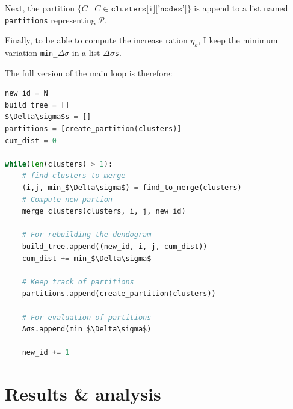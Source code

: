 \documentclass[12pt]{article}
\theoremstyle{definition}
\begin{document}
Next, the partition $\{C \mid C \in \texttt{clusters[i]['nodes']} \}$ is append to a list named \texttt{partitions} representing $\mathcal{P}$.

Finally, to be able to compute the increase ration $\eta_k$, I keep the minimum variation \texttt{min\_$\Delta\sigma$} in a list \texttt{$\Delta\sigma$s}.

The full version of the main loop is therefore:
\begin{lstlisting}[language=Python, mathescape]
new_id = N
build_tree = []
$\Delta\sigma$s = []
partitions = [create_partition(clusters)]
cum_dist = 0

while(len(clusters) > 1):    
    # find clusters to merge
    (i,j, min_$\Delta\sigma$) = find_to_merge(clusters)
    # Compute new partion
    merge_clusters(clusters, i, j, new_id)
    
    # For rebuilding the dendogram
    build_tree.append((new_id, i, j, cum_dist))
    cum_dist += min_$\Delta\sigma$
    
    # Keep track of partitions
    partitions.append(create_partition(clusters))
    
    # For evaluation of partitions
    Δσs.append(min_$\Delta\sigma$)
    
    new_id += 1	
\end{lstlisting}

\section{Results \& analysis}
\end{document}
